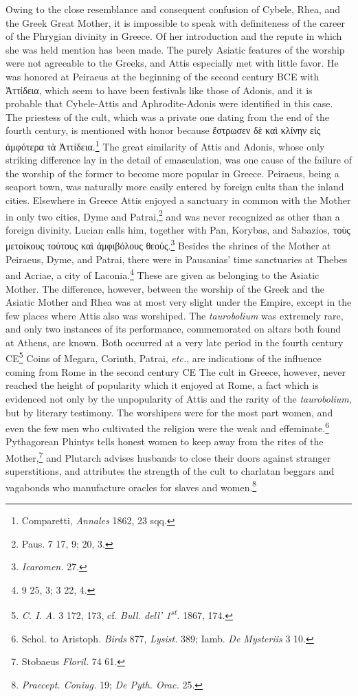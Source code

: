 \documentclass[a4paper, 11pt, oneside, polutonikogreek, french]{article}
\begin{document}
Owing to the close resemblance and consequent confusion of Cybele, Rhea, and the Greek Great Mother, it is impossible to speak with definiteness of the career of the Phrygian divinity in Greece. Of her introduction and the repute in which she was held mention has been made. The purely Asiatic features of the worship were not agreeable to the Greeks, and Attis especially met with little favor. He was honored at Peiraeus at the beginning of the second century \textsc{BCE} with Ἀττίδεια, which seem to have been festivals like those of Adonis, and it is probable that Cybele-Attis and Aphrodite-Adonis were identified in this case. The priestess of the cult, which was a private one dating from the end of the fourth century, is mentioned with honor because ἔστρωσεν δὲ καὶ κλίνην εἰς ἀμφότερα τὰ Ἀττίδεια.\footnote{Comparetti, \emph{Annales} 1862, 23 sqq.} The great similarity of Attis and Adonis, whose only striking difference lay in the detail of emasculation, was one cause of the failure of the worship of the former to become more popular in Greece. Peiraeus, being a seaport town, was naturally more easily entered by foreign cults than the inland cities. Elsewhere in Greece Attis enjoyed a sanctuary in common with the Mother in only two cities, Dyme and Patrai,\footnote{Paus. 7 17, 9; 20, 3.} and was never recognized as other than a foreign divinity. Lucian calls him, together with Pan, Korybas, and Sabazios, τοὺς μετοίκους τούτους καὶ ἀμφιβόλους θεούς.\footnote{\emph{Icaromen.} 27.} Besides the shrines of the Mother at Peiraeus, Dyme, and Patrai, there were in Pausanias' time sanctuaries at Thebes and Acriae, a city of Laconia.\footnote{9 25, 3; 3 22, 4.} These are given as belonging to the Asiatic Mother. The difference, however, between the worship of the Greek and the Asiatic Mother and Rhea was at most very slight under the Empire, except in the few places where Attis also was worshiped. The \emph{taurobolium} was extremely rare, and only two instances of its performance, commemorated on altars both found at Athens, are known. Both occurred at a very late period in the fourth century \textsc{CE}\footnote{\emph{C. I. A.} 3 172, 173, cf. \emph{Bull. dell' 1\textsuperscript{st}.} 1867, 174.} Coins of Megara, Corinth, Patrai, \emph{etc.}, are indications of the influence coming from Rome in the second century \textsc{CE} The cult in Greece, however, never reached the height of popularity which it enjoyed at Rome, a fact which is evidenced not only by the unpopularity of Attis and the rarity of the \emph{taurobolium}, but by literary testimony. The worshipers were for the most part women, and even the few men who cultivated the religion were the weak and effeminate.\footnote{Schol. to Aristoph. \emph{Birds} 877, \emph{Lysist.} 389; Iamb. \emph{De Mysteriis} 3 10.} Pythagorean Phintys tells honest women to keep away from the rites of the Mother,\footnote{Stobaeus \emph{Floril.} 74 61.} and Plutarch advises husbands to close their doors against stranger superstitions, and attributes the strength of the cult to charlatan beggars and vagabonds who manufacture oracles for slaves and women.\footnote{\emph{Praecept. Coniug.} 19; \emph{De Pyth. Orac.} 25.}
\end{document}
